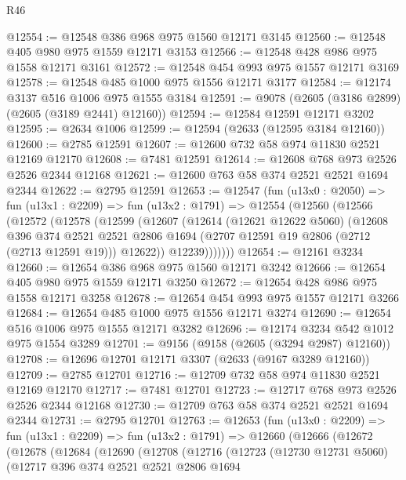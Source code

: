 \begin{lexlean}{R46}
\begin{coremodule}
@12554 := @12548 @386 @968 @975 @1560 @12171 @3145
@12560 := @12548 @405 @980 @975 @1559 @12171 @3153
@12566 := @12548 @428 @986 @975 @1558 @12171 @3161
@12572 := @12548 @454 @993 @975 @1557 @12171 @3169
@12578 := @12548 @485 @1000 @975 @1556 @12171 @3177
@12584 := @12174 @3137 @516 @1006 @975 @1555 @3184
@12591 := @9078 (@2605 (@3186 @2899) (@2605 (@3189 @2441) @12160))
@12594 := @12584 @12591 @12171 @3202
@12595 := @2634 @1006
@12599 := @12594 (@2633 (@12595 @3184 @12160))
@12600 := @2785 @12591
@12607 := @12600 @732 @58 @974 @11830 @2521 @12169 @12170
@12608 := @7481 @12591
@12614 := @12608 @768 @973 @2526 @2526 @2344 @12168
@12621 := @12600 @763 @58 @374 @2521 @2521 @1694 @2344
@12622 := @2795 @12591
@12653 := @12547
    (fun (u13x0 : @2050) =>
    fun (u13x1 : @2209) =>
    fun (u13x2 : @1791) =>
    @12554
      (@12560
        (@12566
          (@12572
            (@12578
              (@12599
                (@12607
                  (@12614
                    (@12621 @12622 @5060)
                    (@12608
                      @396
                      @374
                      @2521
                      @2521
                      @2806
                      @1694
                      (@2707 @12591 @19 @2806 (@2712 (@2713 @12591 @19)))
                      @12622))
                  @12239)))))))
@12654 := @12161 @3234
@12660 := @12654 @386 @968 @975 @1560 @12171 @3242
@12666 := @12654 @405 @980 @975 @1559 @12171 @3250
@12672 := @12654 @428 @986 @975 @1558 @12171 @3258
@12678 := @12654 @454 @993 @975 @1557 @12171 @3266
@12684 := @12654 @485 @1000 @975 @1556 @12171 @3274
@12690 := @12654 @516 @1006 @975 @1555 @12171 @3282
@12696 := @12174 @3234 @542 @1012 @975 @1554 @3289
@12701 := @9156 (@9158 (@2605 (@3294 @2987) @12160))
@12708 := @12696 @12701 @12171 @3307 (@2633 (@9167 @3289 @12160))
@12709 := @2785 @12701
@12716 := @12709 @732 @58 @974 @11830 @2521 @12169 @12170
@12717 := @7481 @12701
@12723 := @12717 @768 @973 @2526 @2526 @2344 @12168
@12730 := @12709 @763 @58 @374 @2521 @2521 @1694 @2344
@12731 := @2795 @12701
@12763 := @12653
    (fun (u13x0 : @2209) =>
    fun (u13x1 : @2209) =>
    fun (u13x2 : @1791) =>
    @12660
      (@12666
        (@12672
          (@12678
            (@12684
              (@12690
                (@12708
                  (@12716
                    (@12723
                      (@12730 @12731 @5060)
                      (@12717
                        @396
                        @374
                        @2521
                        @2521
                        @2806
                        @1694

\end{coremodule}
\end{lexlean}
